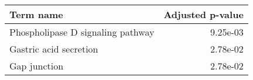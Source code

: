 \begin{tabular}{lr}
\toprule
                        Term name &  Adjusted p-value \\
\midrule
Phospholipase D signaling pathway &          9.25e-03 \\
           Gastric acid secretion &          2.78e-02 \\
                     Gap junction &          2.78e-02 \\
\bottomrule
\end{tabular}
